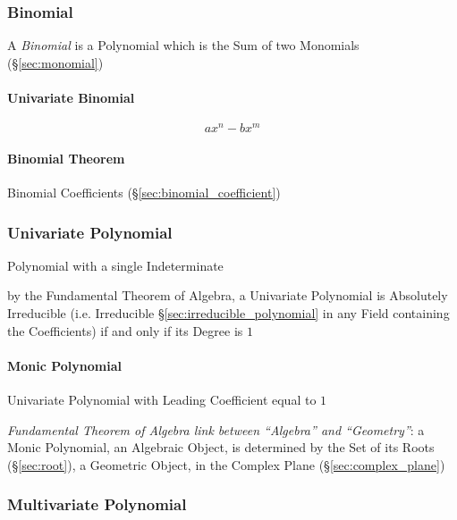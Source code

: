 \subsubsection{Binomial}\label{sec:binomial}

A \emph{Binomial} is a Polynomial which is the Sum of two Monomials
(\S\ref{sec:monomial})



\paragraph{Univariate Binomial}\label{sec:univariate_binomial}\hfill

\[
  a x^n - b x^m
\]


\paragraph{Binomial Theorem}\label{sec:binomial_theorem}\hfill

Binomial Coefficients (\S\ref{sec:binomial_coefficient})



\subsubsection{Univariate Polynomial}\label{sec:univariate_polynomial}

Polynomial with a single Indeterminate

by the Fundamental Theorem of Algebra, a Univariate Polynomial is Absolutely
Irreducible (i.e. Irreducible \S\ref{sec:irreducible_polynomial} in any Field
containing the Coefficients) if and only if its Degree is $1$



\paragraph{Monic Polynomial}\label{sec:monic_polynomial}\hfill

Univariate Polynomial with Leading Coefficient equal to $1$

\emph{Fundamental Theorem of Algebra link between ``Algebra'' and ``Geometry''}:
a Monic Polynomial, an Algebraic Object, is determined by the Set of its Roots
(\S\ref{sec:root}), a Geometric Object, in the Complex Plane
(\S\ref{sec:complex_plane})



\subsubsection{Multivariate Polynomial}\label{sec:multivariate_polynomial}

